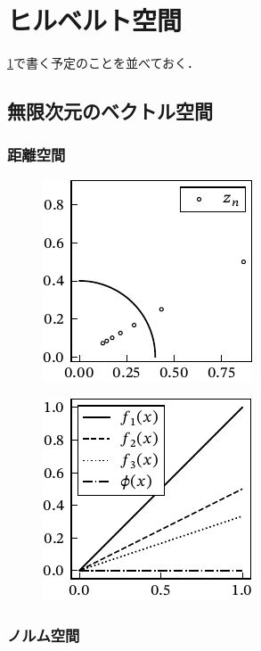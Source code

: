 \documentclass[../../main]{subfiles}
\begin{document}
\chapter{ヒルベルト空間}
\label{chapter:hilbert_space}
\begin{lead}
\cref{chapter:hilbert_space}で書く予定のことを並べておく．
\end{lead}

\section{無限次元のベクトル空間}
\subsection{距離空間}

\begin{figure}[htbp]
  \centering
  \includegraphics{complex_convergence.pdf}
\end{figure}

\begin{figure}[htbp]
  \centering
  \includegraphics{func_convergence.pdf}
\end{figure}

\subsection{ノルム空間}
\end{document}

